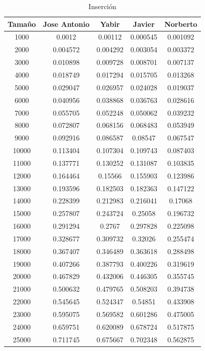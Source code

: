\documentclass[11pt,a4paper]{article}
\begin{document}
\begin{table}[h]
	\centering
	\caption{Inserción}
	\begin{tabular}{ | c | c  | c | c | c | }
		\hline
		Tama\~no & Jose Antonio & Yabir & Javier & Norberto\\
		\hline
		1000	&	0.0012	&	0.00112	&	0.000545	&	0.001092	\\
		2000	&	0.004572	&	0.004292	&	0.003054	&	0.003372	\\
		3000	&	0.010898	&	0.009728	&	0.008701	&	0.007137	\\
		4000	&	0.018749	&	0.017294	&	0.015705	&	0.013268	\\
		5000	&	0.029047	&	0.026957	&	0.024028	&	0.019037	\\
		6000	&	0.040956	&	0.038868	&	0.036763	&	0.028616	\\
		7000	&	0.055705	&	0.052248	&	0.050062	&	0.039232	\\
		8000	&	0.072807	&	0.068156	&	0.068483	&	0.053949	\\
		9000	&	0.092916	&	0.086587	&	0.08547	&	0.067547	\\
		10000	&	0.113404	&	0.107304	&	0.109743	&	0.087403	\\
		11000	&	0.137771	&	0.130252	&	0.131087	&	0.103835	\\
		12000	&	0.164464	&	0.15566	&	0.155903	&	0.123986	\\
		13000	&	0.193596	&	0.182503	&	0.182363	&	0.147122	\\
		14000	&	0.228399	&	0.212983	&	0.216041	&	0.17068	\\
		15000	&	0.257807	&	0.243724	&	0.25058	&	0.196732	\\
		16000	&	0.291294	&	0.2767	&	0.297828	&	0.225098	\\
		17000	&	0.328677	&	0.309732	&	0.32026	&	0.255474	\\
		18000	&	0.367407	&	0.346489	&	0.363618	&	0.288498	\\
		19000	&	0.407266	&	0.387793	&	0.400226	&	0.319619	\\
		20000	&	0.467829	&	0.432006	&	0.446305	&	0.355745	\\
		21000	&	0.500632	&	0.479765	&	0.508203	&	0.394738	\\
		22000	&	0.545645	&	0.524347	&	0.54851	&	0.433908	\\
		23000	&	0.595075	&	0.569582	&	0.601286	&	0.475005	\\
		24000	&	0.659751	&	0.620089	&	0.678724	&	0.517875	\\
		25000	&	0.711745	&	0.675667	&	0.702348	&	0.562875	\\
		\hline
	\end{tabular}
\end{table}
\end{document}
